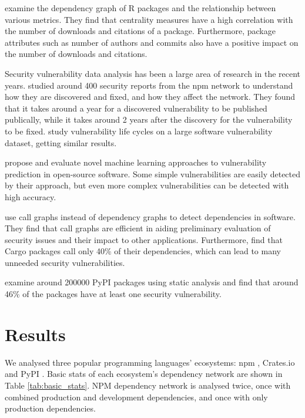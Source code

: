 \documentclass[9pt,twocolumn,twoside]{pnas-report}
\begin{document}
\cite{korkmazrpackages} examine the dependency graph of R packages and the relationship between various metrics.
They find that centrality measures have a high correlation with the number of downloads and citations of a package.
Furthermore, package attributes such as number of authors and commits also have a positive impact on the number of downloads and citations.

Security vulnerability data analysis has been a large area of research in the recent years.
\cite{decan2018vulnerabilities} studied around 400 security reports from the npm network to understand how they are discovered and fixed, and how they affect the network.
They found that it takes around a year for a discovered vulnerability to be published publically, while it takes around 2 years after the discovery for the vulnerability to be fixed.
\cite{shahzad2012} study vulnerability life cycles on a large software vulnerability dataset, getting similar results.

\cite{HANIF2021103009} propose and evaluate novel machine learning approaches to vulnerability prediction in open-source software.
Some simple vulnerabilities are easily detected by their approach, but even more complex vulnerabilities can be detected with high accuracy.

\cite{hejderup2018} use call graphs instead of dependency graphs to detect dependencies in software.
They find that call graphs are efficient in aiding preliminary evaluation of security issues and their impact to other applications.
Furthermore, \cite{hejderup2022prazi} find that Cargo packages call only 40\% of their dependencies, which can lead to many unneeded security vulnerabilities.

\cite{ruohonen2021} examine around 200000 PyPI packages using static analysis and find that around 46\% of the packages have at least one security vulnerability.

\section*{Results}
We analysed three popular programming languages' ecosystems: npm \cite{NPM}, Crates.io \cite{crates} and PyPI \cite{pypi}.
Basic stats of each ecosystem's dependency network are shown in Table \ref{tab:basic_stats}.
NPM dependency network is analysed twice, once with combined production and development dependencies, and once with only production dependencies.
\end{document}
